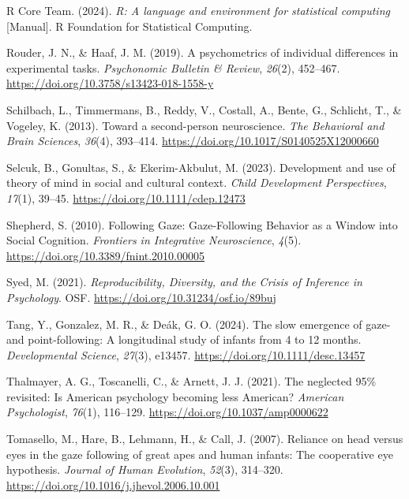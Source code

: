 \documentclass[
  man,floatsintext]{apa7}
\newlength{\cslhangindent}
\newenvironment{CSLReferences}[2] %
 {\begin{list}{}{%
  \setlength{\itemindent}{0pt}
  \setlength{\leftmargin}{0pt}
  \setlength{\parsep}{0pt}
  \ifodd #1
   \setlength{\leftmargin}{\cslhangindent}
   \setlength{\itemindent}{-1\cslhangindent}
  \fi
  \setlength{\itemsep}{#2\baselineskip}}}
 {\end{list}}
\begin{document}
\begin{CSLReferences}{1}{0}
R Core Team. (2024). \emph{R: {A} language and environment for statistical computing} {[}Manual{]}. R Foundation for Statistical Computing.

Rouder, J. N., \& Haaf, J. M. (2019). A psychometrics of individual differences in experimental tasks. \emph{Psychonomic Bulletin \& Review}, \emph{26}(2), 452--467. \url{https://doi.org/10.3758/s13423-018-1558-y}

Schilbach, L., Timmermans, B., Reddy, V., Costall, A., Bente, G., Schlicht, T., \& Vogeley, K. (2013). Toward a second-person neuroscience. \emph{The Behavioral and Brain Sciences}, \emph{36}(4), 393--414. \url{https://doi.org/10.1017/S0140525X12000660}

Selcuk, B., Gonultas, S., \& Ekerim-Akbulut, M. (2023). Development and use of theory of mind in social and cultural context. \emph{Child Development Perspectives}, \emph{17}(1), 39--45. \url{https://doi.org/10.1111/cdep.12473}

Shepherd, S. (2010). Following {Gaze}: {Gaze-Following Behavior} as a {Window} into {Social Cognition}. \emph{Frontiers in Integrative Neuroscience}, \emph{4}(5). \url{https://doi.org/10.3389/fnint.2010.00005}

Syed, M. (2021). \emph{Reproducibility, {Diversity}, and the {Crisis} of {Inference} in {Psychology}}. OSF. \url{https://doi.org/10.31234/osf.io/89buj}

Tang, Y., Gonzalez, M. R., \& Deák, G. O. (2024). The slow emergence of gaze- and point-following: {A} longitudinal study of infants from 4 to 12 months. \emph{Developmental Science}, \emph{27}(3), e13457. \url{https://doi.org/10.1111/desc.13457}

Thalmayer, A. G., Toscanelli, C., \& Arnett, J. J. (2021). The neglected 95\% revisited: {Is American} psychology becoming less {American}? \emph{American Psychologist}, \emph{76}(1), 116--129. \url{https://doi.org/10.1037/amp0000622}

Tomasello, M., Hare, B., Lehmann, H., \& Call, J. (2007). Reliance on head versus eyes in the gaze following of great apes and human infants: The cooperative eye hypothesis. \emph{Journal of Human Evolution}, \emph{52}(3), 314--320. \url{https://doi.org/10.1016/j.jhevol.2006.10.001}


\end{CSLReferences}
\end{document}
